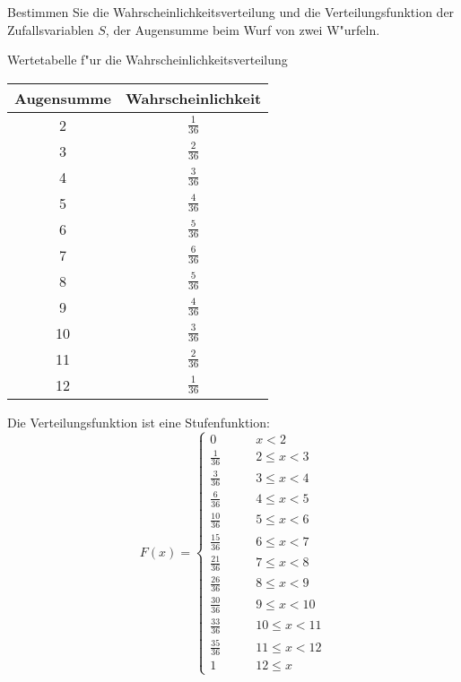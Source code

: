 Bestimmen Sie die Wahrscheinlichkeitsverteilung und die
Verteilungsfunktion der Zufallsvariablen $S$, der Augensumme
beim Wurf von zwei W"urfeln.

\begin{loesung}
Wertetabelle f"ur die Wahrscheinlichkeitsverteilung
\begin{center}
\begin{tabular}{|c|c|}
\hline
Augensumme&Wahrscheinlichkeit\\
\hline
2&$\frac{1}{36}$\\
3&$\frac{2}{36}$\\
4&$\frac{3}{36}$\\
5&$\frac{4}{36}$\\
6&$\frac{5}{36}$\\
7&$\frac{6}{36}$\\
8&$\frac{5}{36}$\\
9&$\frac{4}{36}$\\
10&$\frac{3}{36}$\\
11&$\frac{2}{36}$\\
12&$\frac{1}{36}$\\
\hline
\end{tabular}
\end{center}
Die Verteilungsfunktion ist eine Stufenfunktion:
\[
F(x)=
\begin{cases}
0            &\qquad x < 2\\
\frac{1}{36} &\qquad 2 \le x < 3\\
\frac{3}{36} &\qquad 3 \le x < 4\\
\frac{6}{36} &\qquad 4 \le x < 5\\
\frac{10}{36}&\qquad 5 \le x < 6\\
\frac{15}{36}&\qquad 6 \le x < 7\\
\frac{21}{36}&\qquad 7 \le x < 8\\
\frac{26}{36}&\qquad 8 \le x < 9\\
\frac{30}{36}&\qquad 9 \le x < 10\\
\frac{33}{36}&\qquad 10 \le x < 11\\
\frac{35}{36}&\qquad 11 \le x < 12\\
1            &\qquad 12 \le x
\end{cases}
\]
\end{loesung}

